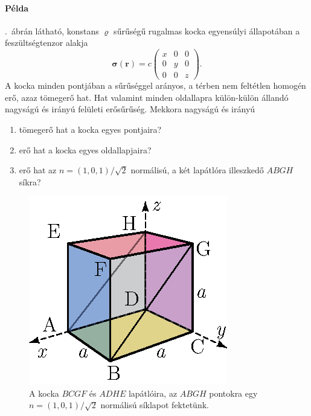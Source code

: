 \documentclass[12pt,a4paper]{scrartcl}
\let\mathbf\bm
\begin{document}
\paragraph{Példa}
.\ ábrán látható, konstans $\varrho$ sűrűségű rugalmas kocka egyensúlyi állapotában a feszültségtenzor alakja 
\[{\mathbf{\sigma }}\left( {\mathbf{r}} \right) = c \left( {\begin{array}{*{20}{c}}
  {{x}}&0&0 \\ 
  0&{{y}}&0 \\ 
  0&0&{{z}} 
\end{array}} \right).\]
A kocka minden pontjában a sűrűséggel arányos, a térben nem feltétlen homogén erő, azaz tömegerő hat. Hat valamint minden oldallapra külön-külön állandó nagyságú és irányú felületi erősűrűség. Mekkora nagyságú és irányú
\begin{enumerate}
\item tömegerő hat a kocka egyes pontjaira?
\item erő hat a kocka egyes oldallapjaira?
\item erő hat az $n = \left( {1,0,1} \right)/\sqrt 2 $ normálisú, a két lapátlóra illeszkedő $ABGH$ síkra?
\end{enumerate}
\begin{figure}[htb] 
\centering    
\includegraphics[scale=1]{figs/kocka_atloval.eps}
\caption{A kocka $BCGF$ és $ADHE$ lapátlóira, az $ABGH$ pontokra egy $n = \left( {1,0,1} \right)/\sqrt 2 $ normálisú síklapot fektetünk. }
\label{fig:kocka_atloval}
\end{figure}
\FloatBarrier
\end{document}
